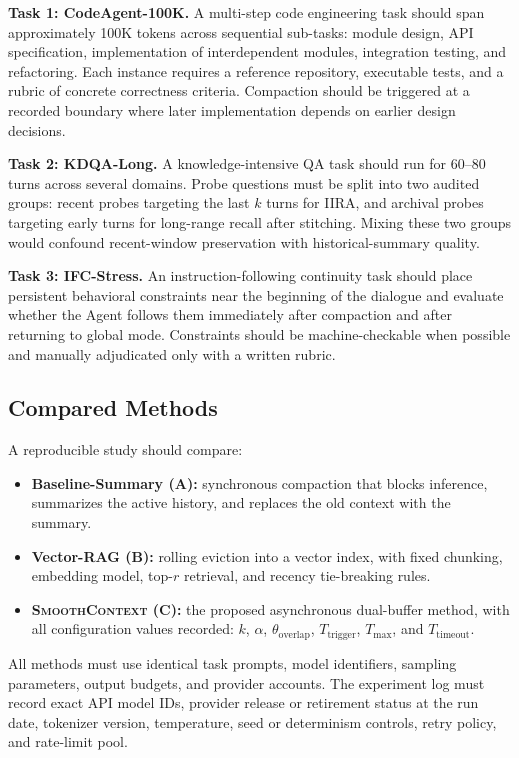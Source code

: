 \documentclass[10pt,twocolumn]{article}
\newcommand{\sys}{\textsc{SmoothContext}}
\newcommand{\Tmax}{T_{\max}}
\newcommand{\Ttrig}{T_{\mathrm{trigger}}}
\begin{document}
\textbf{Task 1: CodeAgent-100K.} A multi-step code engineering task should span approximately 100K tokens across sequential sub-tasks: module design, API specification, implementation of interdependent modules, integration testing, and refactoring. Each instance requires a reference repository, executable tests, and a rubric of concrete correctness criteria. Compaction should be triggered at a recorded boundary where later implementation depends on earlier design decisions.

\textbf{Task 2: KDQA-Long.} A knowledge-intensive QA task should run for 60--80 turns across several domains. Probe questions must be split into two audited groups: recent probes targeting the last $k$ turns for IIRA, and archival probes targeting early turns for long-range recall after stitching. Mixing these two groups would confound recent-window preservation with historical-summary quality.

\textbf{Task 3: IFC-Stress.} An instruction-following continuity task should place persistent behavioral constraints near the beginning of the dialogue and evaluate whether the Agent follows them immediately after compaction and after returning to global mode. Constraints should be machine-checkable when possible and manually adjudicated only with a written rubric.

\subsection{Compared Methods}\label{sec:baselines}

A reproducible study should compare:
\begin{itemize}
  \item \textbf{Baseline-Summary (A):} synchronous compaction that blocks inference, summarizes the active history, and replaces the old context with the summary.
  \item \textbf{Vector-RAG (B):} rolling eviction into a vector index, with fixed chunking, embedding model, top-$r$ retrieval, and recency tie-breaking rules.
  \item \textbf{\sys{} (C):} the proposed asynchronous dual-buffer method, with all configuration values recorded: $k$, $\alpha$, $\theta_{\mathrm{overlap}}$, $\Ttrig$, $\Tmax$, and $T_{\mathrm{timeout}}$.
\end{itemize}

All methods must use identical task prompts, model identifiers, sampling parameters, output budgets, and provider accounts. The experiment log must record exact API model IDs, provider release or retirement status at the run date, tokenizer version, temperature, seed or determinism controls, retry policy, and rate-limit pool.
\end{document}
